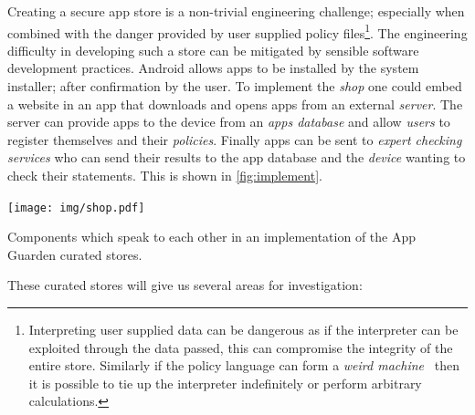 \documentclass[a4paper,sfsidenotes]{%
  scrartcl%
}
\begin{document}
Creating a secure app store is a non-trivial engineering challenge; especially
when combined with the danger provided by user supplied policy
files\footnote{Interpreting user supplied data can be dangerous as if the
  interpreter can be exploited through the data passed, this can compromise the
  integrity of the entire store.  Similarly if the policy language can form a
  \emph{weird machine}~\cite{Bratus:2011wr} then it is possible to tie up the
interpreter indefinitely or perform arbitrary calculations.}. The engineering
difficulty in developing such a store can be mitigated by sensible software
development practices.  Android allows apps to be installed by the system
installer; after confirmation by the user.  To implement the \emph{shop} one
could embed a website in an app that downloads and opens apps from an external
\emph{server}.  The server can provide apps to the device from an \emph{apps
database} and allow \emph{users} to register themselves and their
\emph{policies}.  Finally apps can be sent to \emph{expert checking services}
who can send their results to the app database and the \emph{device} wanting to
check their statements.  This is shown in \autoref{fig:implement}.

\begin{marginfigure}
  \texttt{[image: img/shop.pdf]}
  \caption[Communicating components in App Guarden store.]{Components which speak to each other in an implementation of the App
  Guarden curated stores.}
  \label{fig:implement}
\end{marginfigure}

These curated stores will give us several areas for investigation:
\end{document}
